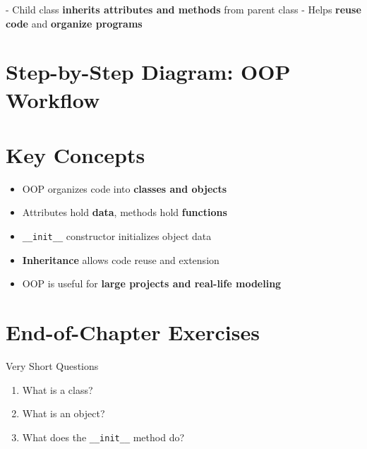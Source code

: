 - Child class \textbf{inherits attributes and methods} from parent class  
- Helps \textbf{reuse code} and \textbf{organize programs}  

\section{Step-by-Step Diagram: OOP Workflow}

\begin{center}
\end{center}

\section{Key Concepts}

\begin{itemize}
    \item OOP organizes code into \textbf{classes and objects}  
    \item Attributes hold \textbf{data}, methods hold \textbf{functions}  
    \item \texttt{\_\_init\_\_} constructor initializes object data  
    \item \textbf{Inheritance} allows code reuse and extension  
    \item OOP is useful for \textbf{large projects and real-life modeling}
\end{itemize}

\section{End-of-Chapter Exercises}

\begin{exercise}{Very Short Questions}
\begin{enumerate}
    \item What is a class?  
    \item What is an object?  
    \item What does the \texttt{\_\_init\_\_} method do?  
\end{enumerate}
\end{exercise}

